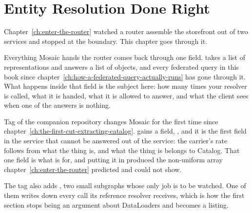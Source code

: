 \chapter{Entity Resolution Done Right}
\label{ch:entity-resolution-done-right}

Chapter~\ref{ch:enter-the-router} watched a router assemble the storefront out
of two services and stopped at the boundary. This chapter goes through it.

Everything Mosaic hands the router comes back through one field.
 takes a list of representations and answers a list of
objects, and every federated query in this book since
chapter~\ref{ch:how-a-federated-query-actually-runs} has gone through it. What
happens inside that field is the subject here: how many times your resolver is
called, what it is handed, what it is allowed to answer, and what the client
sees when one of the answers is nothing.

Tag  of the companion repository changes Mosaic for the first time
since chapter~\ref{ch:the-first-cut-extracting-catalog}.  gains a
field, , and it is the first field in the service that
cannot be answered out of the service: the carrier's rate follows from what the
thing is, and what the thing is belongs to Catalog. That one field is what
 is for, and putting it in produced the non-uniform
 array chapter~\ref{ch:enter-the-router} predicted and could
not show.

The tag also adds , two small subgraphs whose
only job is to be watched. One of them writes down every call its reference
resolver receives, which is how the first section stops being an argument about
DataLoaders and becomes a listing.








